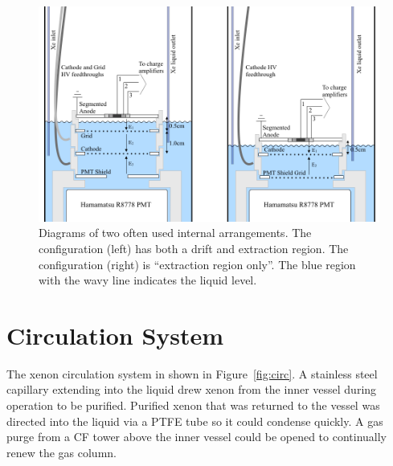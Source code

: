 \begin{figure}[htbp]
\begin{center}
\includegraphics[width=\textwidth]{figures/testbed/internals_1and2.png}
\caption{Diagrams of two often used internal arrangements. The configuration (left) has both a drift and extraction region. The configuration (right) is ``extraction region only''. The blue region with the wavy line indicates the liquid level. }
\label{fig:internals}
\end{center}
\end{figure}


\section{Circulation System}
The xenon circulation system in shown in Figure~\ref{fig:circ}. A stainless steel capillary extending into the liquid drew xenon from the inner vessel during operation to be purified. Purified xenon that was returned to the vessel was directed into the liquid via a \ac{PTFE} tube so it could condense quickly. A gas purge from a \ac{CF} tower above the inner vessel could be opened to continually renew the gas column. 

